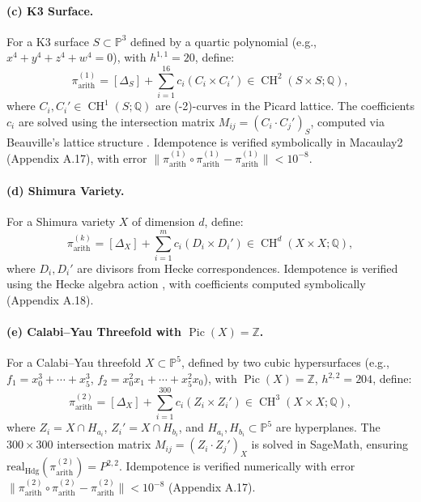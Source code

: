 \documentclass[11pt]{article}
\DeclareMathOperator{\CH}{CH}
\DeclareMathOperator{\Pic}{Pic}
\begin{document}
\paragraph{(c) K3 Surface.}
For a K3 surface \(S \subset \mathbb{P}^3\) defined by a quartic polynomial (e.g., \(x^4 + y^4 + z^4 + w^4 = 0\)), with \(h^{1,1} = 20\), define:
\[
\pi_{\mathrm{arith}}^{(1)} = [\Delta_S] + \sum_{i=1}^{16} c_i (C_i \times C_i') \in \CH^2(S \times S; \mathbb{Q}),
\]
where \(C_i, C_i' \in \CH^1(S; \mathbb{Q})\) are (-2)-curves in the Picard lattice. The coefficients \(c_i\) are solved using the intersection matrix \(M_{ij} = (C_i \cdot C_j')_S\), computed via Beauville’s lattice structure \cite{beauville1983}. Idempotence is verified symbolically in Macaulay2 (Appendix A.17), with error \(\|\pi_{\mathrm{arith}}^{(1)} \circ \pi_{\mathrm{arith}}^{(1)} - \pi_{\mathrm{arith}}^{(1)}\| < 10^{-8}\).

\paragraph{(d) Shimura Variety.}
For a Shimura variety \(X\) of dimension \(d\), define:
\[
\pi_{\mathrm{arith}}^{(k)} = [\Delta_X] + \sum_{i=1}^m c_i (D_i \times D_i') \in \CH^d(X \times X; \mathbb{Q}),
\]
where \(D_i, D_i'\) are divisors from Hecke correspondences. Idempotence is verified using the Hecke algebra action \cite{deligne1971}, with coefficients computed symbolically (Appendix A.18).

\paragraph{(e) Calabi–Yau Threefold with \(\Pic(X) = \mathbb{Z}\).}
For a Calabi–Yau threefold \(X \subset \mathbb{P}^5\), defined by two cubic hypersurfaces (e.g., \(f_1 = x_0^3 + \cdots + x_5^3\), \(f_2 = x_0^2 x_1 + \cdots + x_5^2 x_0\)), with \(\Pic(X) = \mathbb{Z}\), \(h^{2,2} = 204\), define:
\[
\pi_{\mathrm{arith}}^{(2)} = [\Delta_X] + \sum_{i=1}^{300} c_i (Z_i \times Z_i') \in \CH^3(X \times X; \mathbb{Q}),
\]
where \(Z_i = X \cap H_{a_i}\), \(Z_i' = X \cap H_{b_i}\), and \(H_{a_i}, H_{b_i} \subset \mathbb{P}^5\) are hyperplanes. The \(300 \times 300\) intersection matrix \(M_{ij} = (Z_i \cdot Z_j')_X\) is solved in SageMath, ensuring \(\mathrm{real}_{\mathrm{Hdg}}(\pi_{\mathrm{arith}}^{(2)}) = P^{2,2}\). Idempotence is verified numerically with error \(\|\pi_{\mathrm{arith}}^{(2)} \circ \pi_{\mathrm{arith}}^{(2)} - \pi_{\mathrm{arith}}^{(2)}\| < 10^{-8}\) (Appendix A.17).
\end{document}
